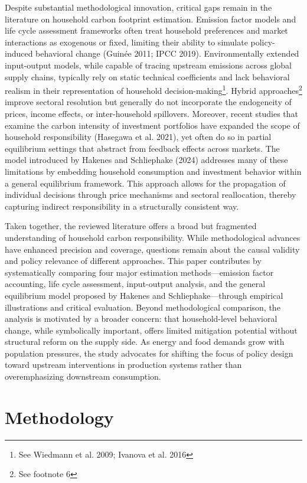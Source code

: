 \documentclass[12pt,a4paper]{article}%
\begin{document}
Despite substantial methodological innovation, critical gaps remain in the literature on household carbon footprint estimation. Emission factor models and life cycle assessment frameworks often treat household preferences and market interactions as exogenous or fixed, limiting their ability to simulate policy-induced behavioral change (Guinée 2011; IPCC 2019). Environmentally extended input-output models, while capable of tracing upstream emissions across global supply chains, typically rely on static technical coefficients and lack behavioral realism in their representation of household decision-making\footnote{See Wiedmann et al. 2009; Ivanova et al. 2016}. Hybrid approaches\footnote{See footnote 6} improve sectoral resolution but generally do not incorporate the endogeneity of prices, income effects, or inter-household spillovers. Moreover, recent studies that examine the carbon intensity of investment portfolios have expanded the scope of household responsibility (Hasegawa et al. 2021), yet often do so in partial equilibrium settings that abstract from feedback effects across markets. The model introduced by Hakenes and Schliephake (2024) addresses many of these limitations by embedding household consumption and investment behavior within a general equilibrium framework. This approach allows for the propagation of individual decisions through price mechanisms and sectoral reallocation, thereby capturing indirect responsibility in a structurally consistent way.

Taken together, the reviewed literature offers a broad but fragmented understanding of household carbon responsibility. While methodological advances have enhanced precision and coverage, questions remain about the causal validity and policy relevance of different approaches. This paper contributes by systematically comparing four major estimation methods—emission factor accounting, life cycle assessment, input-output analysis, and the general equilibrium model proposed by Hakenes and Schliephake—through empirical illustrations and critical evaluation. Beyond methodological comparison, the analysis is motivated by a broader concern: that household-level behavioral change, while symbolically important, offers limited mitigation potential without structural reform on the supply side. As energy and food demands grow with population pressures, the study advocates for shifting the focus of policy design toward upstream interventions in production systems rather than overemphasizing downstream consumption.

\section{Methodology}
\end{document}
